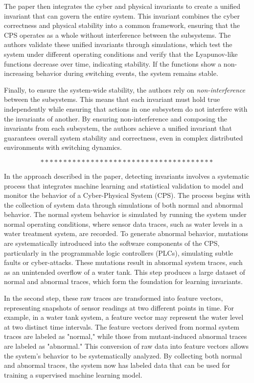 The paper then integrates the cyber and physical invariants to create a unified invariant that can govern the entire system. This invariant combines the cyber correctness and physical stability into a common framework, ensuring that the CPS operates as a whole without interference between the subsystems. The authors validate these unified invariants through simulations, which test the system under different operating conditions and verify that the Lyapunov-like functions decrease over time, indicating stability. If the functions show a non-increasing behavior during switching events, the system remains stable.

Finally, to ensure the system-wide stability, the authors rely on \textit{non-interference} between the subsystems. This means that each invariant must hold true independently while ensuring that actions in one subsystem do not interfere with the invariants of another. By ensuring non-interference and composing the invariants from each subsystem, the authors achieve a unified invariant that guarantees overall system stability and correctness, even in complex distributed environments with switching dynamics\cite{29}.

$$**************************************$$

In the approach described in the paper, detecting invariants involves a systematic process that integrates machine learning and statistical validation to model and monitor the behavior of a Cyber-Physical System (CPS). The process begins with the collection of system data through simulations of both normal and abnormal behavior. The normal system behavior is simulated by running the system under normal operating conditions, where sensor data traces, such as water levels in a water treatment system, are recorded. To generate abnormal behavior, mutations are systematically introduced into the software components of the CPS, particularly in the programmable logic controllers (PLCs), simulating subtle faults or cyber-attacks. These mutations result in abnormal system traces, such as an unintended overflow of a water tank. This step produces a large dataset of normal and abnormal traces, which form the foundation for learning invariants.

In the second step, these raw traces are transformed into feature vectors, representing snapshots of sensor readings at two different points in time. For example, in a water tank system, a feature vector may represent the water level at two distinct time intervals. The feature vectors derived from normal system traces are labeled as "normal," while those from mutant-induced abnormal traces are labeled as "abnormal." This conversion of raw data into feature vectors allows the system's behavior to be systematically analyzed. By collecting both normal and abnormal traces, the system now has labeled data that can be used for training a supervised machine learning model.

